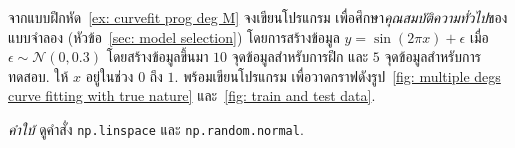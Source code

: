 \begin{Exercise}
	\label{ex: curvefit model selection}
	
	จากแบบฝึกหัด~\ref{ex: curvefit prog deg M}
	จงเขียนโปรแกรม เพื่อศึกษา\textit{คุณสมบัติความทั่วไป}ของแบบจำลอง (หัวข้อ~\ref{sec: model selection}) โดยการสร้างข้อมูล $y = \sin (2 \pi x) + \epsilon$ เมื่อ
	$\epsilon \sim \mathcal{N}(0, 0.3)$ โดยสร้างข้อมูลขึ้นมา $10$ จุดข้อมูลสำหรับการฝึก และ $5$ จุดข้อมูลสำหรับการทดสอบ.
	ให้ $x$ อยู่ในช่วง $0$ ถึง $1$.
	พร้อมเขียนโปรแกรม เพื่อวาดกราฟดังรูป~\ref{fig: multiple degs curve fitting with true nature} และ~\ref{fig: train and test data}. 
	
\textit{คำใบ้} ดูคำสั่ง
\verb|np.linspace| และ \verb|np.random.normal|.

\end{Exercise}

